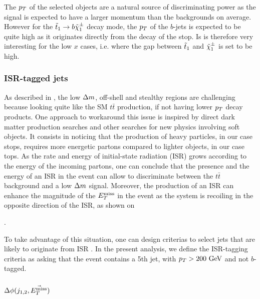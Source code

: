         The $p_T$ of the selected objects are a natural source of discriminating power as
        the signal is expected to have a larger momentum than the backgrounds on average.
        However for the $\tilde{t}_1 \rightarrow b \tilde{\chi}_1^\pm$ decay mode, the $p_T$ of the
        $b$-jets is expected to be quite high as it originates directly from the decay
        of the stop. Is is therefore very interesting for the low $x$ cases, i.e. where
        the gap between $\tilde{t}_1$ and $\tilde{\chi}_1^\pm$ is set to be high.

        \subsubsection{ISR-tagged jets}

        As described in , the low $\Delta m$,
        off-shell and stealthy regions are challenging because looking quite like the SM
        $t\bar{t}$ production, if not having lower $p_T$ decay products. One approach to
        workaround this issue is inspired by direct dark matter production searches and
        other searches for new physics involving soft objects. It consists in noticing that
        the production of heavy particles, in our case stops, requires more energetic
        partons compared to lighter objects, in our case tops. As the rate and energy of
        initial-state radiation (ISR) grows according to the energy of the incoming partons,
        one can conclude that the presence and the energy of an ISR in the event can
        allow to discriminate between the $t\bar{t}$ background and a low $\Delta m$ signal.
        Moreover, the production of an ISR can enhance the magnitude of the $E_T^\text{miss}$ in the
        event as the system is recoiling in the opposite direction of the ISR, as shown on

        .


        To take advantage of this situation, one can design criterias to select jets that
        are likely to originate from ISR .
        In the present analysis, we define the ISR-tagging criteria as asking that
        the event contains a 5th jet, with $p_T > 200 ~\text{GeV}$ and not $b$-tagged.

        \subsubsection{$\Delta \phi( j_{1,2}, \vec{E_T^\text{miss}} )$ }

